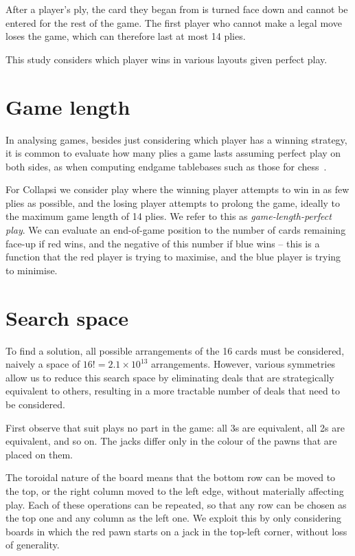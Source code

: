 \documentclass[a4paper, twocolumn]{article}
\begin{document}
After a player's ply, the card they began from is turned face down and cannot be
entered for the rest of the game. The first player who cannot make a legal move
loses the game, which can therefore last at most 14 plies.

This study considers which player wins in various layouts given perfect play.


\section{Game length}

In analysing games, besides just considering which player has a winning
strategy, it is common to evaluate how many plies a game lasts assuming perfect
play on both sides, as when computing endgame tablebases such as those for
chess~\cite{endgame}.

For Collapsi we consider play where the winning player attempts to win in as few
plies as possible, and the losing player attempts to prolong the game, ideally
to the maximum game length of 14 plies. We refer to this as
\textit{game-length-perfect play}. We can evaluate an end-of-game position to
the number of cards remaining face-up if red wins, and the negative of this
number if blue wins -- this is a function that the red player is trying to
maximise, and the blue player is trying to minimise.


\section{Search space}
\label{sec:search-space}

To find a solution, all possible arrangements of the 16 cards must be
considered, naively a space of $16! = 2.1 \times 10^{13}$ arrangements. However,
various symmetries allow us to reduce this search space by eliminating deals
that are strategically equivalent to others, resulting in a more tractable
number of deals that need to be considered.

First observe that suit plays no part in the game: all 3s are equivalent, all 2s
are equivalent, and so on. The jacks differ only in the colour of the pawns that
are placed on them.

The toroidal nature of the board means that the bottom row can be moved to the
top, or the right column moved to the left edge, without materially affecting
play. Each of these operations can be repeated, so that any row can be chosen as
the top one and any column as the left one. We exploit this by only considering
boards in which the red pawn starts on a jack in the top-left corner, without
loss of generality.
\end{document}
